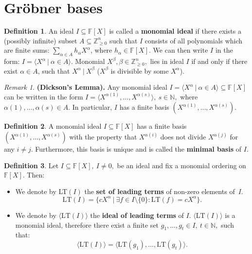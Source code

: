 \documentclass[thesis=M,english]{FITthesis}[2012/10/20]
\theoremstyle{remark}
\newtheorem*{RM}{Remark}
\theoremstyle{definition}
\newtheorem{DF}{Definition}[section]
\begin{document}
\section{Gröbner bases}
\begin{DF}
An ideal $I \subseteq \mathbb{F}[X]$ is called a \textbf{monomial ideal} if there exists a (possibly infinite) subset $A \subseteq \mathbb{Z}_{\geq 0}^n$ such that $I$ consists of all polynomials which are finite sums: $\sum_{\alpha \in A} h_\alpha X^\alpha$, where $h_\alpha \in \mathbb{F}[X].$ We can then write $I$ in the form: $I = \langle X^\alpha \ |\ \alpha \in A\rangle.$ Monomial $X^\beta, \beta \in \mathbb{Z}_{\geq 0}^n,$ lies in ideal $I$ if and only if there exist $\alpha \in A$, such that $X^\alpha \ |\ X^\beta$ ($X^\beta$ is divisible by some $X^\alpha$). 
\end{DF}
\begin{RM}
\textbf{(Dickson's Lemma).} Any monomial ideal $I = \langle X^\alpha \ |\ \alpha \in A\rangle \subseteq \mathbb{F}[X]$ can be written in the form $I = \langle X^{\alpha(1)}, \ldots, X^{\alpha(s)}\rangle,\ s \in \mathbb{N},$ where $\alpha(1), \ldots, \alpha(s) \in A$. In particular, $I$ has a finite basis $(X^{\alpha(1)}, \ldots, X^{\alpha(s)})$.
\end{RM}
\begin{DF}
A monomial ideal $I \subseteq \mathbb{F}[X]$ has a finite basis $(X^{\alpha(1)}, \ldots, X^{\alpha(s)})$ with the property that $X^{\alpha(i)}$ does not divide $X^{\alpha(j)}$ for any $i \neq j$. Furthermore, this basis is unique and is called the \textbf{minimal basis} of $I$.
\end{DF}
\begin{DF}
Let $I \subseteq \mathbb{F}[X],\ I \neq {0},$ be an ideal and fix a monomial ordering on $\mathbb{F}[X]$.  Then:
\begin{itemize}
\item We denote by LT$(I)$ the \textbf{set of leading terms} of non-zero elements of~$I$.
$$
\text{LT}(I) = \{ cX^\alpha \ |\ \exists f \in I \setminus \{0\}: \text{LT}(f)= cX^\alpha \}.
$$
\item We denote by $\langle \text{LT}(I) \rangle$ the \textbf{ideal of leading terms} of $I$. $\langle \text{LT}(I) \rangle$ is a monomial ideal, therefore there exist a finite set $g_1,\ldots, g_t \in I,\ t \in \mathbb{N},$ such that:
$$
\langle \text{LT}(I) \rangle = \langle \text{LT}(g_1), \ldots, \text{LT}(g_t) \rangle.
$$
\end{itemize}
\end{DF}
\end{document}
